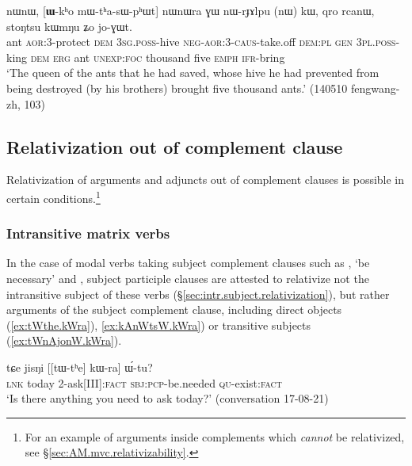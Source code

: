 \begin{exe}
\ex \label{ex:Wkho.mWthasWphWt}
 nɯnɯ, [\textbf{ɯ}-kʰo mɯ-tʰa-sɯ-pʰɯt] nɯnɯra ɣɯ nɯ-rɟɤlpu (nɯ) kɯ, qro rcanɯ, stoŋtsu kɯmŋu ʑo jo-ɣɯt. \\
ant \textsc{aor}:3\flobv{}-protect \textsc{dem} \textsc{3sg}.\textsc{poss}-hive \textsc{neg}-\textsc{aor}:3\flobv{}-\textsc{caus}-take.off \textsc{dem}:\textsc{pl} \textsc{gen} \textsc{3pl}.\textsc{poss}-king \textsc{dem} \textsc{erg} ant \textsc{unexp}:\textsc{foc} thousand five \textsc{emph} \textsc{ifr}-bring \\
\glt `The queen of the ants that he had saved, whose hive he had prevented from being destroyed (by his brothers) brought five thousand ants.' (140510 fengwang-zh, 103)
\end{exe}

  
 
 
\subsection{Relativization out of complement clause} \label{sec:out.complement.relativization}
Relativization of arguments and adjuncts out of complement clauses is possible in certain conditions.\footnote{For an example of arguments  inside complements which \textit{cannot} be relativized, see §\ref{sec:AM.mvc.relativizability}.  }

\subsubsection{Intransitive matrix verbs}  \label{sec:out.complement.relativization.intr}
In the case of modal verbs taking subject complement clauses such as , `be necessary' and ,  subject participle clauses are attested to relativize not the intransitive subject of these verbs (§\ref{sec:intr.subject.relativization}), but rather arguments of the subject complement clause, including direct objects (\ref{ex:tWthe.kWra}), \ref{ex:kAnWtsW.kWra}) or transitive subjects (\ref{ex:tWnAjonW.kWra}).

\begin{exe}
\ex \label{ex:tWthe.kWra}
\gll tɕe jisŋi [[tɯ-tʰe] kɯ-ra] ɯ́-tu? \\
\textsc{lnk} today 2-ask[III]:\textsc{fact} \textsc{sbj}:\textsc{pcp}-be.needed \textsc{qu}-exist:\textsc{fact} \\
\glt `Is there anything you need to ask today?' (conversation 17-08-21)
\end{exe}

